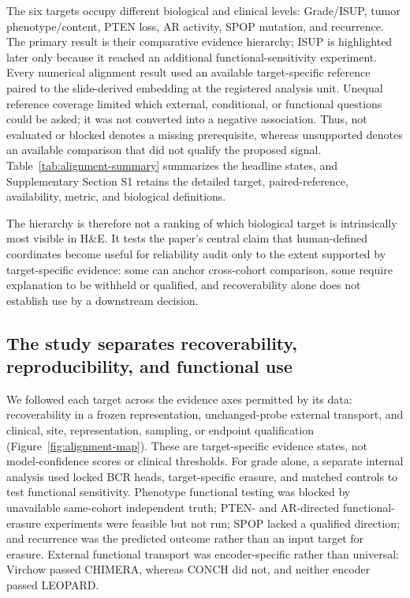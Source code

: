 The six targets occupy different biological and clinical levels: Grade/ISUP, tumor
phenotype/content, PTEN loss, AR activity, SPOP mutation, and recurrence. The primary result
is their comparative evidence hierarchy; ISUP is highlighted later only because it reached an
additional functional-sensitivity experiment. Every numerical alignment result used an available
target-specific reference paired to the slide-derived embedding at the registered analysis unit.
Unequal reference coverage limited which external, conditional, or functional questions could
be asked; it was not converted into a negative association. Thus, not evaluated or blocked
denotes a missing prerequisite, whereas unsupported denotes an available comparison that did
not qualify the proposed signal. Table~\ref{tab:alignment-summary} summarizes the headline
states, and Supplementary Section S1 retains the detailed target, paired-reference,
availability, metric, and biological definitions.

The hierarchy is therefore not a ranking of which biological target is intrinsically most
visible in H\&E. It tests the paper's central claim that human-defined coordinates become useful
for reliability audit only to the extent supported by target-specific evidence: some can anchor
cross-cohort comparison, some require explanation to be withheld or qualified, and recoverability
alone does not establish use by a downstream decision.



\subsection{The study separates recoverability, reproducibility, and functional use}

We followed each target across the evidence axes permitted by its data: recoverability in a
frozen representation, unchanged-probe external transport, and clinical, site, representation,
sampling, or endpoint qualification (Figure~\ref{fig:alignment-map}). These are target-specific
evidence states, not model-confidence scores or clinical thresholds. For grade alone, a separate
internal analysis used locked BCR heads, target-specific erasure, and matched controls to test
functional sensitivity. Phenotype functional testing was blocked by unavailable same-cohort
independent truth; PTEN- and AR-directed functional-erasure experiments were feasible but not
run; SPOP lacked a qualified direction; and recurrence was the predicted outcome rather than an
input target for erasure. External functional transport was encoder-specific rather than
universal: Virchow passed CHIMERA, whereas CONCH did not, and neither encoder passed LEOPARD.

